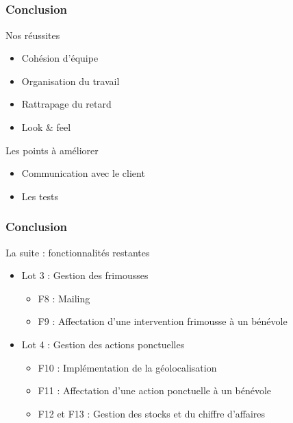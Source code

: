 \subsection{} %

\speaker{\Francois}
\begin{frame}
\frametitle{Conclusion}
\begin{block}{Nos réussites}
	\begin{itemize}
		\item Cohésion d'équipe
		\item Organisation du travail
		\item Rattrapage du retard
		\item Look \& feel
	\end{itemize}
\end{block}
\begin{block}{Les points à améliorer}
	\begin{itemize}
		\item Communication avec le client
		\item Les tests
	\end{itemize}
\end{block}
\end{frame}
	
\begin{frame}
\frametitle{Conclusion}
\begin{block}{La suite : fonctionnalités restantes}
	\begin{itemize}
		\item Lot 3 : Gestion des frimousses
		\begin{itemize}
			\item F8 : Mailing
			\item F9 : Affectation d'une intervention frimousse à un bénévole
		\end{itemize}
		\vspace{.5cm}
		\item Lot 4 : Gestion des actions ponctuelles
		\begin{itemize}
			\item F10 : Implémentation de la géolocalisation
			\item F11 : Affectation d'une action ponctuelle à un bénévole
			\item F12 et F13 : Gestion des stocks et du chiffre d'affaires
		\end{itemize}
	\end{itemize}
\end{block}
\end{frame}
